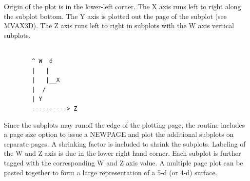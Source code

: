 \documentclass[11pt]{report}
\begin{document}
Origin of the plot is in the lower-left corner.  The X axis runs
left to right along the subplot bottom.  The Y axis is plotted out
the page of the subplot (see MVAX3D).
The Z axis runs left to right in subplots
with the W axis vertical subplots.
\begin{verbatim}

        ^ W  d
        |   | 
        |   |__X
        |  /
        | Y
        ----------> Z
\end{verbatim}

Since the subplots may runoff the edge of the plotting page, the routine
includes a page size option to issue a NEWPAGE and plot the additional
subplots on separate pages.  A shrinking factor is included to shrink the
subplots.
Labeling of the W and Z axis is due in the lower right hand corner.
Each subplot is further tagged with the corresponding W and Z axis
value.  A multiple page plot can be pasted together to form a large
representation of a 5-d (or 4-d) surface.
\end{document}
